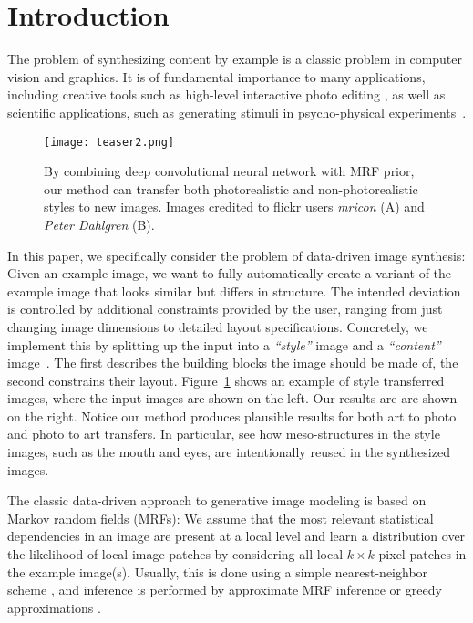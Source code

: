 \documentclass[10pt,twocolumn,letterpaper]{article}
\begin{document}
\section{Introduction}

The problem of synthesizing content by example is a classic problem in computer vision and graphics. It is of fundamental importance to many applications, including creative tools such as high-level interactive photo editing \cite{Agarwala04,Barnes09,Hertzmann01}, as well as scientific applications, such as generating stimuli in psycho-physical experiments~\cite{Gatys2015b}.

\begin{figure}
	\centering
		\texttt{[image: teaser2.png]}
		\caption{By combining deep convolutional neural network with MRF prior, our method can transfer both photorealistic and non-photorealistic styles to new images. Images credited to flickr users \emph{mricon} (A) and \emph{Peter Dahlgren} (B).}
	\label{fig:teaser}
\end{figure}

In this paper, we specifically consider the problem of data-driven image synthesis: Given an example image, we want to fully automatically create a variant of the example image that looks similar but differs in structure. The intended deviation is controlled by additional constraints provided by the user, ranging from just changing image dimensions to detailed layout specifications. Concretely, we implement this by splitting up the input into a \emph{``style''} image and a \emph{``content''} image~\cite{Gatys2015b,Hertzmann01}. The first describes the building blocks the image should be made of, the second constrains their layout. Figure~\ref{fig:teaser} shows an example of style transferred images, where the input images are shown on the left. Our results are are shown on the right. Notice our method produces plausible results for both art to photo and photo to art transfers. In particular, see how meso-structures in the style images, such as the mouth and eyes, are intentionally reused in the synthesized images.

The classic data-driven approach to generative image modeling is based on Markov random fields (MRFs): We assume that the most relevant statistical dependencies in an image are present at a local level and learn a distribution over the likelihood of local image patches by considering all local $k \times k$ pixel patches in the example image(s). Usually, this is done using a simple nearest-neighbor scheme \cite{Efros99}, and inference is performed by approximate MRF inference \cite{Efros01,Kwatra05,Kwatra03} or greedy approximations \cite{Barnes09,Efros99,Hertzmann01,Wei00}.
\end{document}
